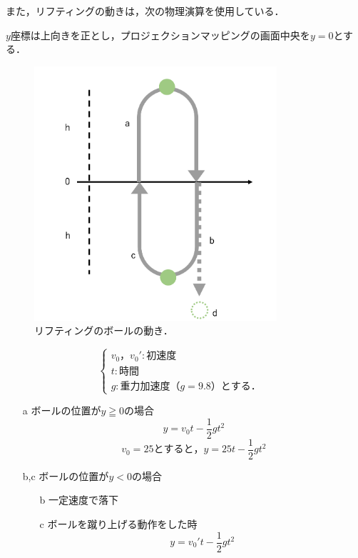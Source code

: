 \vspace{1cm}

また，リフティングの動きは，次の物理演算を使用している．

$y$座標は上向きを正とし，プロジェクションマッピングの画面中央を$y=0$とする．

\clearpage

\begin{figure}[h]
    \centering
    \includegraphics[width=9cm]{image/butsuri2.png}
    \caption[リフティングのボールの動き]{リフティングのボールの動き．}
  \label{butsuri}
\end{figure}



\[
    \begin{cases}
        v_0，v_0': 初速度 & \\
        t: 時間 & \\
        g: 重力加速度（g=9.8）とする． &
    \end{cases}
\]

\vspace{1cm}

\begin{itemize}
    \item[a] ボールの位置が$y \geqq 0$の場合
        \begin{equation}
            y=v_0t-\frac{1}{2}gt^2
        \end{equation}
        \begin{equation}
            v_0=25とすると，y=25t-\frac{1}{2}gt^2
        \end{equation}
    \item[b,c] ボールの位置が$y < 0$の場合
        \begin{itemize}
            \item[b] 一定速度で落下
            \item[c] ボールを蹴り上げる動作をした時
                \begin{equation}
                    y=v_0't-\frac{1}{2}gt^2
                \end{equation}
        \end{itemize}
\end{itemize}


